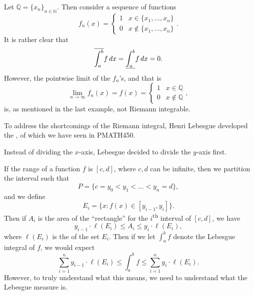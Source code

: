 \documentclass[notoc,notitlepage]{tufte-book}
\begin{document}
\begin{eg}
  Let $\mathbb{Q} = \{ x_n \}_{n \in \mathbb{N}}$. Then
  consider a sequence of functions
  \begin{equation*}
    f_n(x) = \begin{cases}
      1 & x \in \{ x_1, \ldots, x_n \} \\
      0 & x \notin \{ x_1, \ldots, x_n \}
    \end{cases}.
  \end{equation*}
  It is rather clear that
  \begin{equation*}
    \overline{\int_{a}^{b}} f \mathop{}\!d{x} = \underline{\int_{a}^{b}} f \mathop{}\!d{x} = 0.
  \end{equation*}
  However, the pointwise limit of the $f_n$'s, and that is
  \begin{equation*}
    \lim_{n \to \infty} f_n(x) = f(x) = \begin{cases}
      1 & x \in \mathbb{Q} \\
      0 & x \notin \mathbb{Q}
    \end{cases},
  \end{equation*}
  is, as mentioned in the last example, not Riemann integrable.
\end{eg}

To address the shortcomings of the Riemann integral,
Henri Lebesgue developed the ,
of which we have seen in PMATH450.

Instead of dividing the $x$-axis,
Lebesgue decided to divide the $y$-axis first.

If the range of a function $f$ is $[c, d]$, where $c, d$ can be infinite,
then we partition the interval such that
\begin{equation*}
  P = \{ c = y_0 < y_1 < \hdots < y_n = d \},
\end{equation*}
and we define
\begin{equation*}
  E_i = \{ x : f(x) \in [y_{i-1}, y_i] \}.
\end{equation*}
Then if $A_i$ is the area of the ``rectangle'' for
the $i$\textsuperscript{th} interval of $[c, d]$, we have
\begin{equation*}
  y_{i-1} \cdot \ell(E_i) \leq A_i \leq y_i \cdot \ell(E_i),
\end{equation*}
where $\ell(E_i)$ is the  of the set $E_i$.
Then if we let $\int_{a}^{b} f$ denote the Lebesgue integral of $f$,
we would expect
\begin{equation*}
  \sum_{i=1}^{n} y_{i-1} \cdot \ell(E_i)
  \leq \int_{a}^{b} f
  \leq \sum_{i=1}^{n} y_i \cdot \ell(E_i).
\end{equation*}
However, to truly understand what this means,
we need to understand what the Lebesgue measure is.
\end{document}
